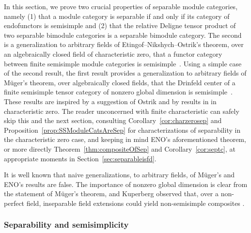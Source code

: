 \documentclass{amsart}
\begin{document}
In this section, we prove two crucial properties of separable module categories, namely (1) that a module category is separable if and only if its category of endofunctors is semisimple and (2) that the relative Deligne tensor product of two separable bimodule categories is a separable bimodule category.  The second is a generalization to arbitrary fields of Etingof--Nikshych--Ostrik's theorem, over an algebraically closed field of characteristic zero, that a functor category between finite semisimple module categories is semisimple~\cite[Theorem 2.16]{MR2183279}.  Using a simple case of the second result, the first result provides a generalization to arbitrary fields of M\"uger's theorem, over algebraically closed fields, that the Drinfeld center of a finite semisimple tensor category of nonzero global dimension is semisimple~\cite[Theorem 3.16]{MR1966525}.    These results are inspired by a suggestion of Ostrik and by results in \cite[\S 2.4]{MR3039775} in characteristic zero.  The reader unconcerned with finite characteristic can safely skip this and the next section, consulting Corollary~\ref{cor:charzerosep} and Proposition~\ref{prop:SSModuleCatsAreSep} for characterizations of separability in the characteristic zero case, and keeping in mind ENO's aforementioned theorem, or more directly Theorem~\ref{thm:compositeOfSep} and Corollary~\ref{cor:septc}, at appropriate moments in Section~\ref{sec:separableisfd}.



\begin{remark}
It is well known that naive generalizations, to arbitrary fields, of M\"uger's and ENO's results are false.  The importance of nonzero global dimension is clear from the statement of M\"uger's theorem, and Kuperberg observed that, over a non-perfect field, inseparable field extensions could yield non-semisimple composites \cite[Section 5]{MR1995781}.
\end{remark} 



\subsubsection{Separability and semisimplicity} \label{sec:sepandsemi}
\end{document}
